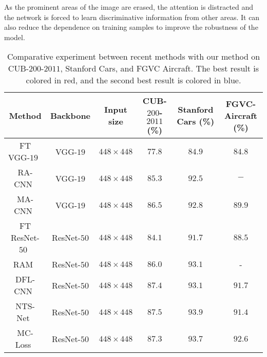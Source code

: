 \documentclass[conference]{IEEEtran}
\begin{document}
As the prominent areas of the image are erased, the attention is distracted and the network is forced to learn discriminative information from other areas. It can also reduce the dependence on training samples to improve the robustness of the model.
\begin{table*}[ht]
\begin{center}
\caption{Comparative experiment between recent methods with our method on CUB-$200$-$2011$, Stanford Cars, and FGVC Aircraft. The best result is colored in red, and the second best result is colored in blue.} \label{tab:results}
\begin{tabular}{c|c|c|c|c|c}
  \hline
  Method & Backbone & Input size & CUB-$200$-$2011$ (\%) & Stanford Cars (\%) & FGVC-Aircraft (\%) \\
  \hline
\hline
FT VGG-$19$~\cite{wang2018learning} & VGG-$19$ & $448 \times 448$ & $77.8$ & $84.9$ & $84.8$ \\
RA-CNN~\cite{fu2017look} & VGG-$19$ & $448 \times 448$ & $85.3$ & $92.5$ & $-$ \\
MA-CNN~\cite{zheng2017recognition} & VGG-$19$ & $448 \times 448$ & $86.5$ & $92.8$ & $89.9$ \\
  \hline
  FT ResNet-$50$~\cite{wang2018learning} & ResNet-$50$ & $448 \times 448$ & $84.1$ & $91.7$ & $88.5$ \\
    RAM~\cite{Li_2017_ICCV} & ResNet-$50$ & $448 \times 448$ & $86.0$ & $93.1$ & - \\

      DFL-CNN~\cite{wang2018learning} & ResNet-$50$ & $448 \times 448$ & $87.4$ & $93.1$ & $91.7$ \\

      NTS-Net~\cite{yang2018learning} & ResNet-$50$ & $448 \times 448$ & $87.5$ & $93.9$ & $91.4$ \\
        MC-Loss~\cite{chang2020mc} & ResNet-$50$ & $448 \times 448$ & $87.3$ & $93.7$ & $92.6$ \\


\end{tabular}
\end{center}
\end{table*}
\end{document}
